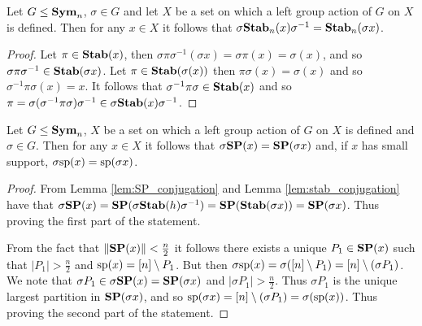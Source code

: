 \documentclass[../paper.tex]{subfiles}
\begin{document}

\begin{lem}
  \label{lem:stab_conjugation}
  Let $G \leq \text{\textbf{Sym}}_n$, $\sigma \in G$ and let $X$ be a set on which a left group
  action of $G$ on $X$ is defined. Then for any $x \in X$ it follows that
  $\sigma \text{\textbf{Stab}}_n (x) \sigma^{-1} = \text{\textbf{Stab}}_n(\sigma x)$.
\end{lem}

\begin{proof}
  Let $\pi \in \text{\textbf{Stab}}(x)$, then $\sigma \pi \sigma^{-1}(\sigma x) = \sigma \pi
  (x) = \sigma (x)$, and so $\sigma \pi \sigma^{-1} \in \text{\textbf{Stab}}(\sigma x)$. Let
  $\pi \in \text{\textbf{Stab}}(\sigma (x))$ then $\pi \sigma (x) = \sigma (x)$ and so
  $\sigma^{-1} \pi \sigma (x) = x$. It follows that $\sigma^{-1} \pi \sigma \in
  \text{\textbf{Stab}}(x)$ and so $\pi = \sigma (\sigma^{-1} \pi \sigma) \sigma ^{-1} \in
  \sigma \text{\textbf{Stab}}(x) \sigma^{-1}$.
\end{proof}

\begin{lem}
  \label{lem:support-mapping}
  Let $G \leq \text{\textbf{Sym}}_n$, $X$ be a set on which a left group action of $G$ on $X$
  is defined and $\sigma \in G$. Then for any $x \in X$ it follows that $\sigma
  \text{\textbf{SP}} (x) = \text{\textbf{SP}} (\sigma x)$ and, if $x$ has small support, $\sigma \text{sp} (x) =
  \text{sp} (\sigma x)$.
\end{lem}
\begin{proof}
  From Lemma \ref{lem:SP_conjugation} and Lemma \ref{lem:stab_conjugation} have
  that $\sigma \text{\textbf{SP}} (x) = \text{\textbf{SP}}(\sigma \text{\textbf{Stab}}(h) \sigma^{-1}) = \text{\textbf{SP}} (\text{\textbf{Stab}}(\sigma
  x)) = \text{\textbf{SP}} (\sigma x)$. Thus proving the first part of the statement.

  From the fact that $\| \text{\textbf{SP}}(x) \| < \frac{n}{2}$ it follows there exists a
  unique $P_1 \in \text{\textbf{SP}}(x)$ such that $\vert P_1 \vert > \frac{n}{2}$ and
  $\text{sp}(x) = [n] \setminus P_1$. But then $\sigma \text{sp} (x) = \sigma([n]
  \setminus P_1) = [n] \setminus (\sigma P_1)$. We note that $\sigma P_1 \in
  \sigma \text{\textbf{SP}} (x) = \text{\textbf{SP}}(\sigma x)$ and $\vert \sigma P_1 \vert > \frac{n}{2}$.
  Thus $\sigma P_1$ is the unique largest partition in $\text{\textbf{SP}}(\sigma x)$, and so
  $\text{sp}(\sigma x) = [n]\setminus (\sigma P_1) = \sigma (\text{sp}(x))$. Thus
  proving the second part of the statement.
\end{proof}
\end{document}

